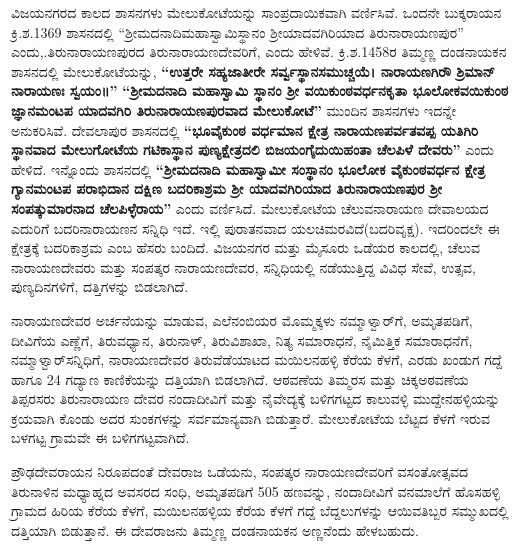 ವಿಜಯನಗರದ ಕಾಲದ ಶಾಸನಗಳು ಮೇಲುಕೋಟೆಯನ್ನು ಸಾಂಪ್ರದಾಯಿಕವಾಗಿ ವರ್ಣಿಸಿವೆ. ಒಂದನೇ ಬುಕ್ಕರಾಯನ ಕ್ರಿ.ಶ.1369 ಶಾಸನದಲ್ಲಿ “ಶ‍್ರೀಮದನಾದಿಮಹಾಸ್ವಾಮಿಸ್ಥಾನಂ ಶ‍್ರೀಯಾದವಗಿರಿಯಾದ ತಿರುನಾರಾಯಣಪುರ” ಎಂದು,.ತಿರುನಾರಾಯಣಪುರದ ತಿರುನಾರಾಯಣದೇವರಿಗೆ, ಎಂದು ಹೇಳಿವೆ. ಕ್ರಿ.ಶ.1458ರ ತಿಮ್ಮಣ್ಣ ದಂಡನಾಯಕನ ಶಾಸನದಲ್ಲಿ ಮೇಲುಕೋಟೆಯನ್ನು, \textbf{ “ಉತ್ತರೇ ಸಹ್ಯಜಾತೀರೇ ಸರ್ವ್ವಸ್ಥಾನಸಮುಚ್ಚಯೆ। ನಾರಾಯಣಗಿರೌ ಶ್ರಿಮಾನ್​ ನಾರಾಯಣಃ ಸ್ವಯಂ॥”} \textbf{“ಶ‍್ರೀಮದನಾದಿ ಮಹಾಸ್ವಾಮಿ ಸ್ಥಾನಂ ಶ‍್ರೀ ವಯಿಕುಂಠವರ್ಧನಕೃತಾ ಭೂಲೋಕವಯಿಕುಂಠ ಜ್ಞಾನಮಂಟಪ ಯಾದವಗಿರಿ ತಿರುನಾರಾಯಣಪುರವಾದ ಮೇಲುಕೋಟೆ”} ಮುಂದಿನ ಶಾಸನಗಳು ಇದನ್ನೇ ಅನುಕರಿಸಿವೆ. ದೇವಲಾಪುರ ಶಾಸನದಲ್ಲಿ \textbf{“ಭೂವೈಕುಂಠ ವರ್ಧಮಾನ ಕ್ಷೇತ್ರ ನಾರಾಯಣಪರ್ವತವಪ್ಪ ಯತಿಗಿರಿ ಸ್ಥಾನವಾದ ಮೇಲುಗೋಟೆಯ ಗಟಿಕಾಸ್ಥಾನ ಪುಣ್ಯಕ್ಷೇತ್ರದಲಿ ಬಿಜಯಂಗೈದುಯಿಹಂತಾ ಚೆಲಪಿಳೆ ದೇವರು” }ಎಂದು ಹೇಳಿದೆ. ಇನ್ನೊಂದು ಶಾಸನದಲ್ಲಿ\textbf{ “ಶ‍್ರೀಮದನಾದಿ ಮಹಾಸ್ವಾಮೀ ಸಂಸ್ಥಾನಂ ಭೂಲೋಕ ವೈಕುಂಠವರ್ಧನ ಕ್ಷೇತ್ರ ಗ್ಯಾನಮಂಟಪ ಪರಾಭಿದಾನ ದಕ್ಷಿಣ ಬದರಿಕಾಶ್ರಮ ಶ‍್ರೀ ಯಾದವಗಿರಿಯಾದ ತಿರುನಾರಾಯಣಪುರ ಶ‍್ರೀ ಸಂಪತ್ಕುಮಾರನಾದ ಚೆಲಪಿಳ್ಳೆರಾಯ” }ಎಂದು ವರ್ಣಿಸಿದೆ. ಮೇಲುಕೋಟೆಯ ಚೆಲುವನಾರಾಯಣ ದೇವಾಲಯದ ಎದುರಿಗೆ ಬದರಿನಾರಾಯಣನ ಸನ್ನಿಧಿ ಇದೆ. ಇಲ್ಲಿ ಪುರಾತನವಾದ ಯಲಚಿಮರವಿದೆ(ಬದರಿವೃಕ್ಷ). ಇದರಿಂದಲೇ ಈ ಕ್ಷೇತ್ರಕ್ಕೆ ಬದರಿಕಾಶ್ರಮ ಎಂಬ ಹೆಸರು ಬಂದಿದೆ. ವಿಜಯನಗರ ಮತ್ತು ಮೈಸೂರು ಒಡೆಯರ ಕಾಲದಲ್ಲಿ, ಚೆಲುವ ನಾರಾಯಣದೇವರು ಮತ್ತು ಸಂಪತ್ಕರ ನಾರಾಯಣದೇವರ, ಸನ್ನಿಧಿಯಲ್ಲಿ ನಡೆಯುತ್ತಿದ್ದ ವಿವಿಧ ಸೇವೆ, ಉತ್ಸವ, ಪುಣ್ಯದಿನಗಳಿಗೆ, ದತ್ತಿಗಳನ್ನು ಬಿಡಲಾಗಿದೆ.

ನಾರಾಯಣದೇವರ ಅರ್ಚನೆಯನ್ನು ಮಾಡುವ, ಎಲೆನಂಬಿಯರ ಮೊಮ್ಮಕ್ಕಳು ನಮ್ಮಾಳ್ವಾರ್​ಗೆ, ಅಮೃತಪಡಿಗೆ, ದೀವಿಗೆಯ ಎಣ್ಣೆಗೆ, ತಿರುವಧ್ಯಾನ, ತಿರುನಾಳ್​, ತಿರುವಿಶಾಖಾ, ನಿತ್ಯ ಸಮಾರಾಧನೆ, ನೈಮಿತ್ತಿಕ ಸಮಾರಾಧನೆಗೆ, ನಮ್ಮಾಳ್ವಾರ್​ ಸನ್ನಿಧಿಗೆ, ನಾರಾಯಣದೇವರ ತಿರುವೆಡೆಯಾಟದ ಮಯಿಲನಹಳ್ಳಿ ಕೆರೆಯ ಕೆಳಗೆ, ಎರಡು ಖಂಡುಗ ಗದ್ದೆ ಹಾಗೂ 24 ಗದ್ಯಾಣ ಕಾಣಿಕೆಯನ್ನು ದತ್ತಿಯಾಗಿ ಬಿಡಲಾಗಿದೆ. ಆಠವಣೆಯ ತಿಮ್ಮರಸ ಮತ್ತು ಚಿಕ್ಕಅಠವಣೆಯ ತಿಪ್ಪರಸರು ತಿರುನಾರಾಯಣ ದೇವರ ನಂದಾದೀವಿಗೆ ಮತ್ತು ನೈವೇದ್ಯಕ್ಕೆ ಬಳಿಗಗಟ್ಟದ ಕಾಲುವಳ್ಳಿ ಮುದ್ದೇನಹಳ್ಳಿಯನ್ನು ಕ್ರಯವಾಗಿ ಕೊಂಡು ಅದರ ಸುಂಕಗಳನ್ನು ಸರ್ವಮಾನ್ಯವಾಗಿ ಬಿಡುತ್ತಾರೆ. ಮೇಲುಕೋಟೆಯ ಬೆಟ್ಟದ ಕೆಳಗೆ ಇರುವ ಬಳಗಟ್ಟ ಗ್ರಾಮವೇ ಈ ಬಳಿಗಗಟ್ಟವಾಗಿದೆ.

ಪ್ರೌಢದೇವರಾಯನ ನಿರೂಪದಂತೆ ದೇವರಾಜ ಒಡೆಯನು, ಸಂಪತ್ಕರ ನಾರಾಯಣದೇವರಿಗೆ ವಸಂತೋತ್ಸವದ ತಿರುನಾಳಿನ ಮಧ್ಯಾಹ್ನದ ಅವಸರದ ಸಂಧಿ, ಅಮೃತಪಡಿಗೆ 505 ಹಣವನ್ನು, ನಂದಾದೀವಿಗೆ ವನಮಾಲೆಗೆ ಹೊಸಹಳ್ಳಿ ಗ್ರಾಮದ ಹಿರಿಯ ಕೆರೆಯ ಕೆಳಗೆ, ಮಯಿಲನಹಳ್ಳಿಯ ಕೆರೆಯ ಕೆಳಗೆ ಗದ್ದೆ ಬೆದ್ದಲುಗಳನ್ನು ಆಯಿವತಿಬ್ಬರ ಸಮ್ಮುಖದಲ್ಲಿ ದತ್ತಿಯಾಗಿ ಬಿಡುತ್ತಾನೆ. ಈ ದೇವರಾಜನು ತಿಮ್ಮಣ್ಣ ದಂಡನಾಯಕನ ಅಣ್ಣನೆಂದು ಹೇಳಬಹುದು.

